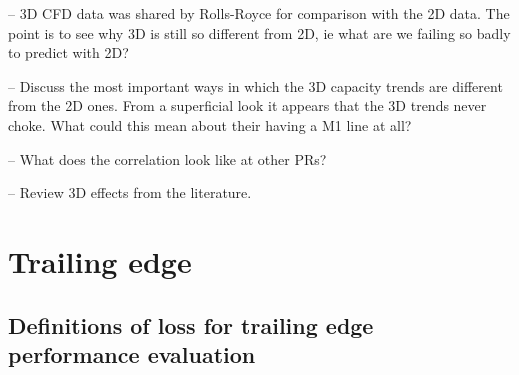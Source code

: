 \documentclass[a4paper, 11pt, twoside]{report}
\begin{document}
-- 3D CFD data was shared by Rolls-Royce for comparison with the 2D data. The point is to see why 3D is still so different from 2D, ie what are we failing so badly to predict with 2D?

-- Discuss the most important ways in which the 3D capacity trends are different from the 2D ones. From a superficial look it appears that the 3D trends never choke. What could this mean about their having a M1 line at all?

-- What does the correlation look like at other PRs?

-- Review 3D effects from the literature.



\chapter{Trailing edge}
\label{chapter_trailing_edge}




\section{Definitions of loss for trailing edge performance evaluation}
\end{document}
